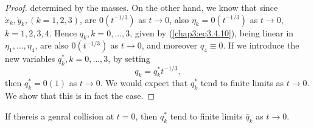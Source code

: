 \begin{proof}
determined by the masses. On the other hand, we know that since
$\dot{x}_k, \dot{y}_k, (k = 1,2,3)$, are $0(t^{-1/3})$ as $t \to 0$,
also $\dot{\eta}_k = 0 (t^{-1/3})$ as $t \to 0$, $k = 1,2,3,4$. Hence
$q_k, k = 0, \ldots, 3$, given by (\ref{chap3:eq3.4.10}), being linear
in $\eta_1, \ldots, \eta_4$, are also $0(t^{-1/3})$ as $t \to 0$, and
moreover $q_4 \equiv 0$. If we introduce the new variables $q^*_k, k =
0, \ldots, 3$, by setting 
\begin{equation*}
q_k = q^*_k t^{-1/3}, \tag{3.4.19}\label{chap3:eq3.4.19}
\end{equation*}
then $q^*_k = 0(1)$ as $t \to 0$. We would expect that $q^*_k$ tend to
finite limits as $t \to 0$. We show that this is in fact the case. 
\end{proof}

\begin{subtheorem}\label{chap3:thm3.4.2}
If there\pageoriginale is a genral collision at $t =0$, then $q^*_k$
tend to finite limits $\bar{q}_k$ as $t \to 0$. 
\end{subtheorem}

